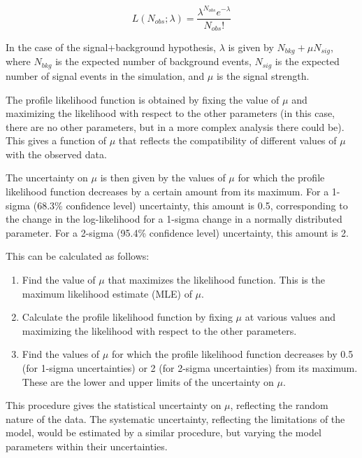 \begin{equation}
    L(N_{obs}; \lambda) = \frac{\lambda^{N_{obs}} e^{-\lambda}}{N_{obs}!}
\end{equation}

In the case of the signal+background hypothesis, $\lambda$ is given by $N_{bkg} + \mu N_{sig}$, where $N_{bkg}$ is the expected number of
background events, $N_{sig}$ is the expected number of signal events in the simulation, and $\mu$ is the signal strength.

The profile likelihood function is obtained by fixing the value of $\mu$ and maximizing the likelihood with respect to the
other parameters (in this case, there are no other parameters, but in a more complex analysis there could be). This
gives a function of $\mu$ that reflects the compatibility of different values of $\mu$ with the observed data.

The uncertainty on $\mu$ is then given by the values of $\mu$ for which the profile likelihood function decreases by a certain
amount from its maximum. For a 1-sigma (68.3\% confidence level) uncertainty, this amount is 0.5, corresponding to the
change in the log-likelihood for a 1-sigma change in a normally distributed parameter. For a 2-sigma (95.4\% confidence
level) uncertainty, this amount is 2.

This can be calculated as follows:

\begin{enumerate}
    \item Find the value of $\mu$ that maximizes the likelihood function. This is the maximum likelihood estimate (MLE)
          of $\mu$.
    \item Calculate the profile likelihood function by fixing $\mu$ at various values and maximizing the
          likelihood with respect to
          the other parameters.
    \item Find the values of $\mu$ for which the profile likelihood function decreases by 0.5 (for 1-sigma
          uncertainties) or 2 (for 2-sigma uncertainties) from its maximum. These are the lower and upper limits of the
          uncertainty on $\mu$.
\end{enumerate}

This procedure gives the statistical uncertainty on $\mu$, reflecting the random nature of the data. The systematic
uncertainty, reflecting the limitations of the model, would be estimated by a similar procedure, but varying the model
parameters within their uncertainties.


